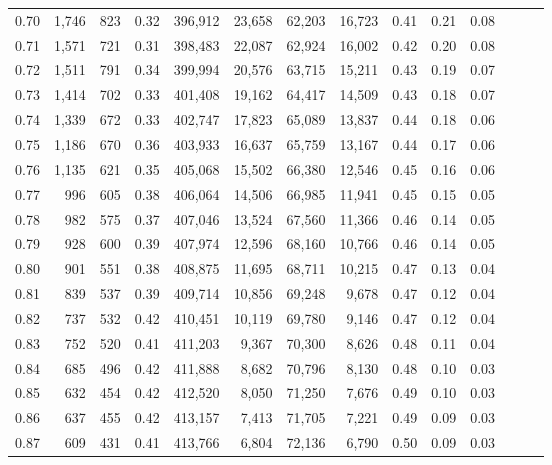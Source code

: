 \begin{tabular}{rrrrrrrrrrrrrr}
0.70 &   1,746 &    823 &  0.32 &  396,912 &   23,658 &  62,203 &  16,723 &  0.41 &  0.21 &      0.08 \\
0.71 &   1,571 &    721 &  0.31 &  398,483 &   22,087 &  62,924 &  16,002 &  0.42 &  0.20 &      0.08 \\
0.72 &   1,511 &    791 &  0.34 &  399,994 &   20,576 &  63,715 &  15,211 &  0.43 &  0.19 &      0.07 \\
0.73 &   1,414 &    702 &  0.33 &  401,408 &   19,162 &  64,417 &  14,509 &  0.43 &  0.18 &      0.07 \\
0.74 &   1,339 &    672 &  0.33 &  402,747 &   17,823 &  65,089 &  13,837 &  0.44 &  0.18 &      0.06 \\
0.75 &   1,186 &    670 &  0.36 &  403,933 &   16,637 &  65,759 &  13,167 &  0.44 &  0.17 &      0.06 \\
0.76 &   1,135 &    621 &  0.35 &  405,068 &   15,502 &  66,380 &  12,546 &  0.45 &  0.16 &      0.06 \\
0.77 &     996 &    605 &  0.38 &  406,064 &   14,506 &  66,985 &  11,941 &  0.45 &  0.15 &      0.05 \\
0.78 &     982 &    575 &  0.37 &  407,046 &   13,524 &  67,560 &  11,366 &  0.46 &  0.14 &      0.05 \\
0.79 &     928 &    600 &  0.39 &  407,974 &   12,596 &  68,160 &  10,766 &  0.46 &  0.14 &      0.05 \\
0.80 &     901 &    551 &  0.38 &  408,875 &   11,695 &  68,711 &  10,215 &  0.47 &  0.13 &      0.04 \\
0.81 &     839 &    537 &  0.39 &  409,714 &   10,856 &  69,248 &   9,678 &  0.47 &  0.12 &      0.04 \\
0.82 &     737 &    532 &  0.42 &  410,451 &   10,119 &  69,780 &   9,146 &  0.47 &  0.12 &      0.04 \\
0.83 &     752 &    520 &  0.41 &  411,203 &    9,367 &  70,300 &   8,626 &  0.48 &  0.11 &      0.04 \\
0.84 &     685 &    496 &  0.42 &  411,888 &    8,682 &  70,796 &   8,130 &  0.48 &  0.10 &      0.03 \\
0.85 &     632 &    454 &  0.42 &  412,520 &    8,050 &  71,250 &   7,676 &  0.49 &  0.10 &      0.03 \\
0.86 &     637 &    455 &  0.42 &  413,157 &    7,413 &  71,705 &   7,221 &  0.49 &  0.09 &      0.03 \\
0.87 &     609 &    431 &  0.41 &  413,766 &    6,804 &  72,136 &   6,790 &  0.50 &  0.09 &      0.03 \\

\end{tabular}
